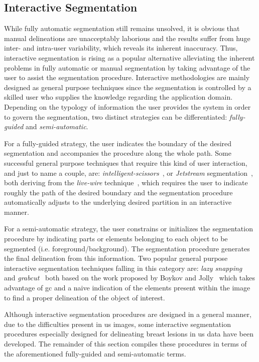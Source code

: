 \documentclass[authoryear,preprint,review,12pt]{elsarticle}
\begin{document}
\subsection{Interactive Segmentation}   
While fully automatic segmentation still remains unsolved, it is obvious that manual delineations are unacceptably laborious and the results suffer from huge inter- and intra-user variability, which reveals its inherent inaccuracy.
Thus, interactive segmentation is rising as a popular alternative alleviating the inherent problems in fully automatic or manual segmentation by taking advantage of the user to assist the segmentation procedure. Interactive methodologies are mainly designed as general purpose techniques since the segmentation is controlled by a skilled user who supplies the knowledge regarding the application domain. 
Depending on the typology of information the user provides the system in order to govern the segmentation, two distinct strategies can be differentiated: \emph{fully-guided} and \emph{semi-automatic}. 

For a fully-guided strategy, the user indicates the boundary of the desired segmentation and accompanies the procedure along the whole path. Some successful general purpose techniques that require this kind of user interaction, and just to name a couple, are: \emph{intelligent-scissors}~\cite{mortensen1998interactive}, or \emph{Jetstream} segmentation~\cite{perez2001jetstream}, both deriving from the \emph{live-wire} technique~\cite{falcao1998user}, which requires the user to indicate roughly the path of the desired boundary and the segmentation procedure automatically adjusts to the underlying desired partition in an interactive manner. 

For a semi-automatic strategy, the user constrains or initializes the segmentation procedure by indicating parts or elements belonging to each object to be segmented (i.e. foreground/background).  The segmentation procedure generates the final delineation from this information. Two popular general purpose interactive segmentation techniques falling in this category are: \emph{lazy snapping}~\cite{li2004lazy} and \emph{grabcut}~\cite{rother2004grabcut} both based on the work proposed by Boykov and Jolly~\cite{boykov2001interactive} which takes advantage of \ac{gc} and a naive indication of the elements present within the image to find a proper delineation of the object of interest.

Although interactive segmentation procedures are designed in a general manner, due to the difficulties present in \ac{us} images, some interactive segmentation procedures especially designed for delineating breast lesions in \ac{us} data have been developed. The remainder of this section compiles these procedures in terms of the aforementioned fully-guided and semi-automatic terms.
\end{document}

